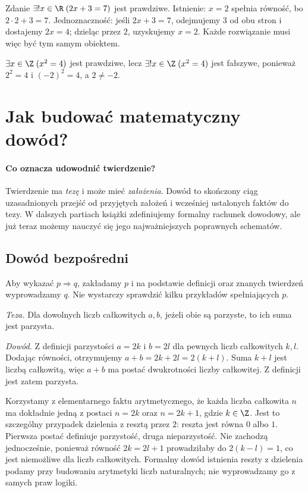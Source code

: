 \begin{przyklad}
Zdanie $\exists!x\in\R\;(2x+3=7)$ jest prawdziwe.
Istnienie: $x=2$ spełnia równość, bo $2\cdot2+3=7$.
Jednoznaczność: jeśli $2x+3=7$, odejmujemy $3$ od
obu stron i dostajemy $2x=4$; dzieląc przez $2$,
uzyskujemy $x=2$. Każde rozwiązanie musi więc
być tym samym obiektem.
\end{przyklad}

\begin{przyklad}
$\exists x\in\Z\;(x^2=4)$ jest prawdziwe,
lecz $\exists!x\in\Z\;(x^2=4)$ jest fałszywe,
ponieważ $2^2=4$ i $(-2)^2=4$, a $2\ne-2$.
\end{przyklad}

\section{Jak budować matematyczny dowód?}\label{sec:proof-methods}
\paragraph{Co oznacza udowodnić twierdzenie?}
Twierdzenie ma \emph{tezę} i może mieć \emph{założenia}.
Dowód to skończony ciąg uzasadnionych przejść
od przyjętych założeń i wcześniej ustalonych faktów
do tezy. W dalszych partiach książki zdefiniujemy
formalny rachunek dowodowy, ale już teraz możemy
nauczyć się jego najważniejszych poprawnych schematów.

\subsection{Dowód bezpośredni}\label{sec:direct-proof}
Aby wykazać $p\Rightarrow q$, zakładamy $p$
i na podstawie definicji oraz znanych twierdzeń
wyprowadzamy $q$. Nie wystarczy sprawdzić
kilku przykładów spełniających $p$.

\begin{przyklad}
\label{ex:even-sum}
\emph{Teza.} Dla dowolnych liczb całkowitych $a,b$,
jeżeli obie są parzyste, to ich suma jest parzysta.

\emph{Dowód.} Z definicji parzystości $a=2k$
i $b=2l$ dla pewnych liczb całkowitych $k,l$.
Dodając równości, otrzymujemy
$a+b=2k+2l=2(k+l)$. Suma $k+l$ jest liczbą
całkowitą, więc $a+b$ ma postać dwukrotności
liczby całkowitej. Z definicji jest zatem parzysta.
\end{przyklad}

\begin{uwaga}
Korzystamy z elementarnego faktu arytmetycznego, że każda
liczba całkowita $n$ ma dokładnie jedną z postaci
$n=2k$ oraz $n=2k+1$, gdzie $k\in\Z$.
Jest to szczególny przypadek dzielenia z resztą przez $2$:
reszta jest równa $0$ albo $1$. Pierwsza postać definiuje
parzystość, druga nieparzystość. Nie zachodzą jednocześnie,
ponieważ równość $2k=2l+1$ prowadziłaby do
$2(k-l)=1$, co jest niemożliwe dla liczb całkowitych.
Formalny dowód istnienia reszty z dzielenia podamy przy
budowaniu arytmetyki liczb naturalnych; nie wyprowadzamy
go z samych praw logiki.
\end{uwaga}

